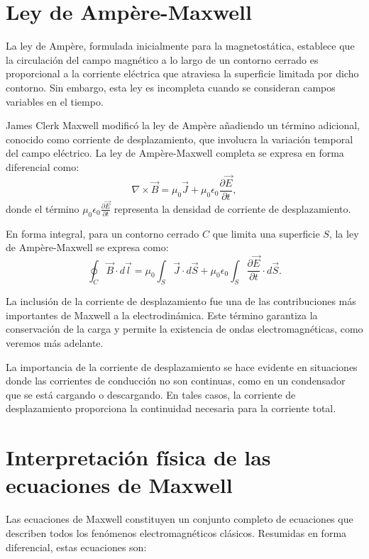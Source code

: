 \documentclass[12pt,a4paper]{book}
\begin{document}
\section{Ley de Ampère-Maxwell}

La ley de Ampère, formulada inicialmente para la magnetostática, establece que la circulación del campo magnético a lo largo de un contorno cerrado es proporcional a la corriente eléctrica que atraviesa la superficie limitada por dicho contorno. Sin embargo, esta ley es incompleta cuando se consideran campos variables en el tiempo.

James Clerk Maxwell modificó la ley de Ampère añadiendo un término adicional, conocido como corriente de desplazamiento, que involucra la variación temporal del campo eléctrico. La ley de Ampère-Maxwell completa se expresa en forma diferencial como:
\begin{equation}
\nabla \times \vec{B} = \mu_0 \vec{J} + \mu_0 \epsilon_0 \frac{\partial \vec{E}}{\partial t},
\end{equation}
donde el término $\mu_0 \epsilon_0 \frac{\partial \vec{E}}{\partial t}$ representa la densidad de corriente de desplazamiento.

En forma integral, para un contorno cerrado $C$ que limita una superficie $S$, la ley de Ampère-Maxwell se expresa como:
\begin{equation}
\oint_C \vec{B} \cdot d\vec{l} = \mu_0 \int_S \vec{J} \cdot d\vec{S} + \mu_0 \epsilon_0 \int_S \frac{\partial \vec{E}}{\partial t} \cdot d\vec{S}.
\end{equation}

La inclusión de la corriente de desplazamiento fue una de las contribuciones más importantes de Maxwell a la electrodinámica. Este término garantiza la conservación de la carga y permite la existencia de ondas electromagnéticas, como veremos más adelante.

La importancia de la corriente de desplazamiento se hace evidente en situaciones donde las corrientes de conducción no son continuas, como en un condensador que se está cargando o descargando. En tales casos, la corriente de desplazamiento proporciona la continuidad necesaria para la corriente total.

\section{Interpretación física de las ecuaciones de Maxwell}

Las ecuaciones de Maxwell constituyen un conjunto completo de ecuaciones que describen todos los fenómenos electromagnéticos clásicos. Resumidas en forma diferencial, estas ecuaciones son:
\end{document}
